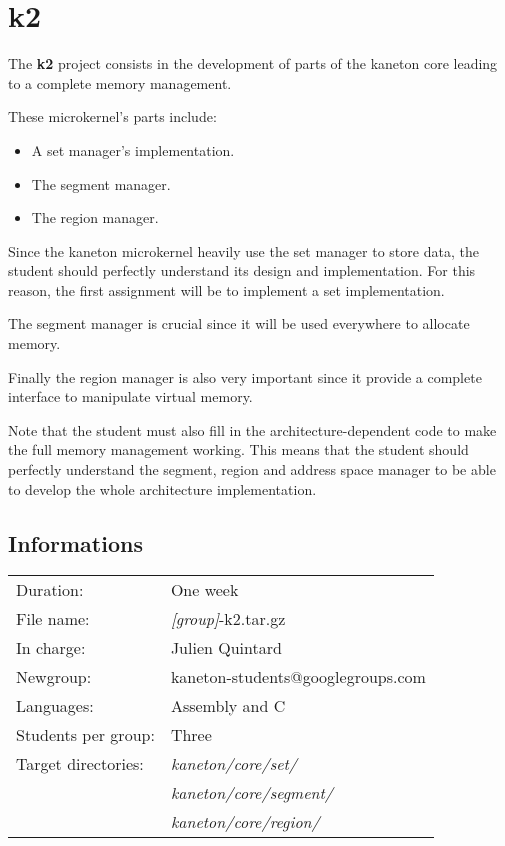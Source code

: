 
%
%

\chapter{k2}

The \textbf{k2} project consists in the development of parts of
the kaneton core leading to a complete memory management.

These microkernel's parts include:

\begin{itemize}
  \item
    A set manager's implementation.
  \item
    The segment manager.
  \item
    The region manager.
\end{itemize}

Since the kaneton microkernel heavily use the set manager to store data,
the student should perfectly understand its design and implementation.
For this reason, the first assignment will be to implement a set
implementation.

The segment manager is crucial since it will be used everywhere to allocate
memory.

Finally the region manager is also very important since it provide a complete
interface to manipulate virtual memory.

Note that the student must also fill in the architecture-dependent code
to make the full memory management working. This means that the student
should perfectly understand the segment, region and address space manager
to be able to develop the whole architecture implementation.

\newpage

%
%

\section{Informations}

\begin{tabular}{p{7cm}l}
Duration: & One week \\
File name: & \textit{[group]}-k2.tar.gz \\
In charge: & Julien Quintard \\
Newgroup: & kaneton-students@googlegroups.com \\
Languages: & Assembly and C \\
Students per group: & Three \\
Target directories:
  & \textit{kaneton/core/set/} \\
  & \textit{kaneton/core/segment/} \\
  & \textit{kaneton/core/region/} \\
\end{tabular}

